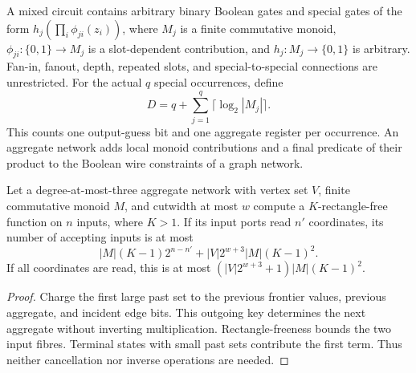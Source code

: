 \begin{definition}
  \label{def:lowerbounds-algebraic-aggregate-budget}
  \leanok
  A mixed circuit contains arbitrary binary Boolean gates and special gates of the form
  $h_j(\prod_i \phi_{ji}(z_i))$, where $M_j$ is a finite commutative monoid,
  $\phi_{ji}:\{0,1\}\to M_j$ is a slot-dependent contribution, and
  $h_j:M_j\to\{0,1\}$ is arbitrary. Fan-in, fanout, depth, repeated slots, and
  special-to-special connections are unrestricted. For the actual $q$ special
  occurrences, define
  \[
    D=q+\sum_{j=1}^q\lceil\log_2 |M_j|\rceil.
  \]
  This counts one output-guess bit and one aggregate register per occurrence.
  An aggregate network adds local monoid contributions and a final predicate of
  their product to the Boolean wire constraints of a graph network.
\end{definition}

\begin{theorem}
  \label{thm:lowerbounds-algebraic-aggregate-count}
  \leanok
  Let a degree-at-most-three aggregate network with vertex set $V$, finite
  commutative monoid $M$, and cutwidth at most $w$ compute a $K$-rectangle-free
  function on $n$ inputs, where $K>1$. If its input ports read $n'$ coordinates,
  its number of accepting inputs is at most
  \[
    |M|(K-1)2^{n-n'}+|V|2^{w+3}|M|(K-1)^2.
  \]
  If all coordinates are read, this is at most
  $(|V|2^{w+3}+1)|M|(K-1)^2$.
\end{theorem}
\begin{proof}
  \leanok
  Charge the first large past set to the previous frontier values, previous
  aggregate, and incident edge bits. This outgoing key determines the next
  aggregate without inverting multiplication. Rectangle-freeness bounds the
  two input fibres. Terminal states with small past sets contribute the first
  term. Thus neither cancellation nor inverse operations are needed.
\end{proof}

